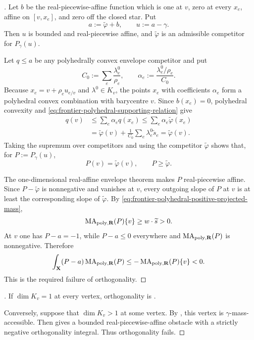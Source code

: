 \begin{proof}[]
Let $b$ be the real-piecewise-affine function which is one at $v$, zero at
every $x_e$, affine on $[v,x_e]$, and zero off the closed star.  Put
\[
                         a:=\widetilde\varphi+b,
                         \qquad
                         u:=a-\gamma.
\]
Then $u$ is bounded and real-piecewise affine, and
$\widetilde\varphi$ is an admissible competitor for $P_\gamma(u)$.

Let $q\leq a$ be any polyhedrally convex envelope competitor and put
\[
 C_0:=\sum_e\frac{\lambda^0_e}{\rho_e},
 \qquad
 \alpha_e:=\frac{\lambda^0_e/\rho_e}{C_0}.
\]
Because $x_e=v+\rho_eu_{e/v}$ and $\lambda^0\in K_v$, the points $x_e$
with coefficients $\alpha_e$ form a polyhedral convex combination with
barycentre $v$.  Since $b(x_e)=0$, polyhedral convexity and
\eqref{eq:frontier-polyhedral-supporting-relation} give
\[
 \begin{aligned}
 q(v)
 &\leq\sum_e\alpha_eq(x_e)
 \leq\sum_e\alpha_e\widetilde\varphi(x_e)\\
 &=\widetilde\varphi(v)
   +\frac{1}{C_0}\sum_e\lambda^0_e\widetilde s_e
 =\widetilde\varphi(v).
 \end{aligned}
\]
Taking the supremum over competitors and using the competitor
$\widetilde\varphi$ shows that, for $P:=P_\gamma(u)$,
\[
                         P(v)=\widetilde\varphi(v),
                         \qquad
                         P\geq\widetilde\varphi.
\]

The one-dimensional real-affine envelope theorem makes $P$
real-piecewise affine.  Since $P-\widetilde\varphi$ is nonnegative and
vanishes at $v$, every outgoing slope of $P$ at $v$ is at least the
corresponding slope of $\widetilde\varphi$.  By
\eqref{eq:frontier-polyhedral-positive-projected-mass},
\[
              \operatorname{MA}_{\mathrm{poly},\mathbf R}(P)\{v\}
              \geq w\mathbin{\cdot}\widetilde s>0.
\]
At $v$ one has $P-a=-1$, while $P-a\leq0$ everywhere and
$\operatorname{MA}_{\mathrm{poly},\mathbf R}(P)$ is nonnegative.  Therefore
\[
 \int_{\mathbf X}(P-a)\operatorname{MA}_{\mathrm{poly},\mathbf R}(P)
 \leq-\operatorname{MA}_{\mathrm{poly},\mathbf R}(P)\{v\}<0.
\]
This is the required failure of orthogonality.
\end{proof}

\begin{proof}[]
If $\dim K_v=1$ at every vertex, orthogonality is
.

Conversely, suppose that $\dim K_v>1$ at some vertex.  By
, this vertex is
$\gamma$-mass-accessible.  Then
 gives a bounded
real-piecewise-affine obstacle with a strictly negative orthogonality
integral.  Thus orthogonality fails.
\end{proof}
